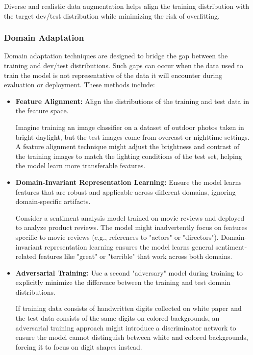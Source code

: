 \documentclass[12pt,openany, draft]{book}
\begin{document}
Diverse and realistic data augmentation helps align the training distribution with the target dev/test distribution while minimizing the risk of overfitting.

\subsubsection{Domain Adaptation}

Domain adaptation techniques are designed to bridge the gap between the training and dev/test distributions. Such gaps can occur when the data used to train the model is not representative of the data it will encounter during evaluation or deployment. These methods include:

\begin{itemize}
    \item \textbf{Feature Alignment:} Align the distributions of the training and test data in the feature space.

    \begin{examplebox}
    Imagine training an image classifier on a dataset of outdoor photos taken in bright daylight, but the test images come from overcast or nighttime settings. A feature alignment technique might adjust the brightness and contrast of the training images to match the lighting conditions of the test set, helping the model learn more transferable features.
    \end{examplebox}

    \item \textbf{Domain-Invariant Representation Learning:} Ensure the model learns features that are robust and applicable across different domains, ignoring domain-specific artifacts.

    \begin{examplebox}
    Consider a sentiment analysis model trained on movie reviews and deployed to analyze product reviews. The model might inadvertently focus on features specific to movie reviews (e.g., references to "actors" or "directors"). Domain-invariant representation learning ensures the model learns general sentiment-related features like "great" or "terrible" that work across both domains.
    \end{examplebox}

    \item \textbf{Adversarial Training:} Use a second "adversary" model during training to explicitly minimize the difference between the training and test domain distributions.

    \begin{examplebox}
    If training data consists of handwritten digits collected on white paper and the test data consists of the same digits on colored backgrounds, an adversarial training approach might introduce a discriminator network to ensure the model cannot distinguish between white and colored backgrounds, forcing it to focus on digit shapes instead.
    \end{examplebox}
    
\end{itemize}
\end{document}

